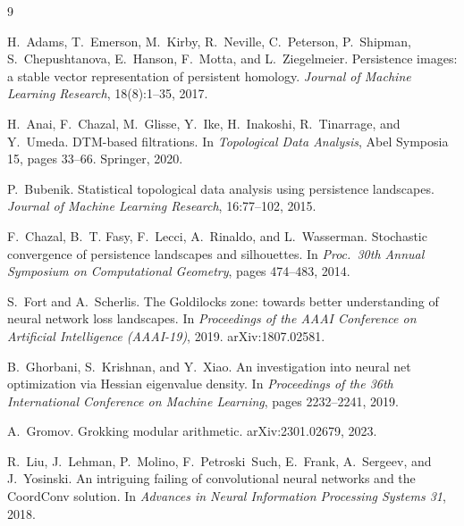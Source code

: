 \documentclass[11pt,a4paper]{article}
\begin{document}
{\footnotesize
\setlength{\bibsep}{1pt plus 0.3ex}
\begin{thebibliography}{9}
\setlength{\itemsep}{0pt}
\setlength{\parskip}{0pt}

H.~Adams, T.~Emerson, M.~Kirby, R.~Neville, C.~Peterson, P.~Shipman,
S.~Chepushtanova, E.~Hanson, F.~Motta, and L.~Ziegelmeier.
\newblock Persistence images: a stable vector representation of persistent
homology.
\newblock \emph{Journal of Machine Learning Research}, 18(8):1--35, 2017.

H.~Anai, F.~Chazal, M.~Glisse, Y.~Ike, H.~Inakoshi, R.~Tinarrage, and
Y.~Umeda.
\newblock DTM-based filtrations.
\newblock In \emph{Topological Data Analysis}, Abel Symposia 15, pages 33--66.
Springer, 2020.

P.~Bubenik.
\newblock Statistical topological data analysis using persistence landscapes.
\newblock \emph{Journal of Machine Learning Research}, 16:77--102, 2015.

F.~Chazal, B.~T. Fasy, F.~Lecci, A.~Rinaldo, and L.~Wasserman.
\newblock Stochastic convergence of persistence landscapes and silhouettes.
\newblock In \emph{Proc.\ 30th Annual Symposium on Computational Geometry},
pages 474--483, 2014.

S.~Fort and A.~Scherlis.
\newblock The Goldilocks zone: towards better understanding of neural network
loss landscapes.
\newblock In \emph{Proceedings of the AAAI Conference on Artificial
Intelligence (AAAI-19)}, 2019. arXiv:1807.02581.

B.~Ghorbani, S.~Krishnan, and Y.~Xiao.
\newblock An investigation into neural net optimization via Hessian eigenvalue
density.
\newblock In \emph{Proceedings of the 36th International Conference on Machine
Learning}, pages 2232--2241, 2019.

A.~Gromov.
\newblock Grokking modular arithmetic.
\newblock arXiv:2301.02679, 2023.

R.~Liu, J.~Lehman, P.~Molino, F.~Petroski~Such, E.~Frank, A.~Sergeev, and
J.~Yosinski.
\newblock An intriguing failing of convolutional neural networks and the
CoordConv solution.
\newblock In \emph{Advances in Neural Information Processing Systems 31}, 2018.


\end{thebibliography}}
\end{document}
